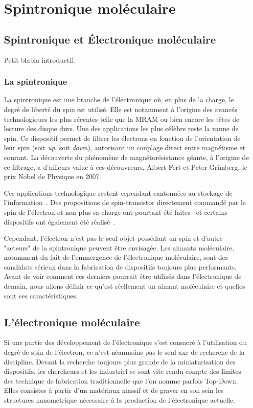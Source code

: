 \chapter{Spintronique moléculaire}

\section{Spintronique et Électronique moléculaire}
Petit blabla introductif.
\subsection{La spintronique}
La spintronique est une branche de l'électronique où, en plus de la charge, le degré de liberté du spin est utilisé. Elle est notamment à l'origine des avancés technologiques les plus récentes telle que la MRAM ou bien encore les têtes de lecture des disque durs. Une des applications les plus célèbre reste la vanne de spin. Ce dispositif permet de filtrer les électrons en fonction de l'orientation de leur spin (soit \textit{up}, soit \textit{down}), autorisant un couplage direct entre magnétisme et courant. La découverte du phénomène de magnétorésistance géante, à l'origine de ce filtrage, a d'ailleurs value à ces découvreurs, Albert Fert et Peter Grünberg, le prix Nobel de Physique en 2007.


Ces applications technologique restent cependant cantonnées au stockage de  l'information~\cite{Awschalom2007}. Des propositions de spin-transistor directement commandé par le spin de l'électron et non plus sa charge ont pourtant été faites~\cite{Datta1990} et certains dispositifs ont également été réalisé~\cite{Johnson1996,Huang2007}.

Cependant, l'électron n'est pas le seul objet possédant un spin et d'autre "acteurs" de la spintronique peuvent être envisagée. Les aimants moléculaire, notamment du fait de l'emmergence de l'électronique moléculaire, sont des candidats sérieux dans la fabrication de dispositifs toujours plus performants. Avant de voir comment ces derniers pourrait \^etre utilisés dans l'électronique de demain, nous allons définir ce qu'est réellement un aimant moléculaire et quelles sont ces caractéristiques.

\section{L'électronique moléculaire}
Si une partie des développement de l'électronique s'est consacré à l'utilisation du degré de spin de l'électron, ce n'est néanmoins pas le seul axe de recherche de la discipline. Devant la recherche toujours plus grande de la miniaturisation des dispositifs, les chercheurs et les industriel se sont vite rendu compte des limites des technique de fabrication traditionnelle que l'on nomme parfois Top-Down. Elles consistes à partir d'un matériaux massif et de graver en son sein les structures nanométrique nécessaire à la production de l'électronique actuelle.




